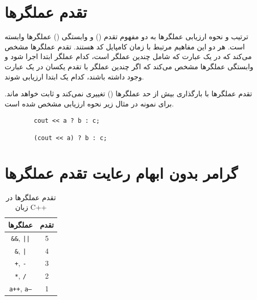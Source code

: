 \documentclass[12pt, a4paper]{report}
\begin{document}
\section{تقدم عملگر‌ها}


ترتیب و نحوه ارزیابی عملگر‌ها به دو مفهوم تقدم () و وابستگی () عملگر‌ها 
وابسته است. هر دو این مفاهیم مرتبط با زمان کامپایل کد هستند.
تقدم عملگرها مشخص می‌کند که در یک عبارت که شامل چندین عملگر است، کدام عملگر ابتدا اجرا شود و وابستگی عملگرها مشخص می‌کند که اگر چندین عملگر با تقدم یکسان در یک عبارت وجود داشته باشند، کدام یک ابتدا ارزیابی شوند.


	
	

تقدم عملگر‌ها با بارگذاری بیش از حد عملگر‌ها () تغییری نمی‌کند و ثابت خواهد ماند.
برای نمونه در مثال زیر نحوه ارزیابی مشخص شده است.

\begin{LTR} %
	\begin{lstlisting}
		cout << a ? b : c;
	\end{lstlisting}
\end{LTR}

\begin{LTR} %
	\begin{lstlisting}
		(cout << a) ? b : c;
	\end{lstlisting}
\end{LTR}
\section{گرامر بدون ابهام رعایت تقدم عملگر‌ها}

\begin{table}[h!]
	\centering
	\begin{tabular}{|c|c|}
		\hline
		\textbf{عملگرها} & \textbf{تقدم} \\
		\hline
		\texttt{\&\&}, \texttt{||} & 5 \\
		\hline
		\texttt{\&}, \texttt{|} & 4 \\
		\hline
		\texttt{+}, \texttt{-} & 3 \\
		\hline
		\texttt{*}, \texttt{/} & 2 \\
		\hline
		\texttt{a++}, \texttt{a--} & 1 \\
		\hline
	\end{tabular}
	\caption{تقدم عملگرها در زبان C++}
	\label{tab:operator_precedence}
\end{table}
\end{document}
